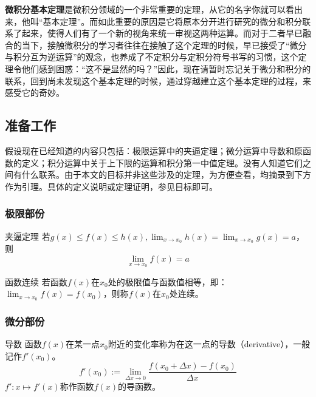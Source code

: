 
\begin{issues}
\issueTODO
\issueMissDepend
\issueNeedCite
\end{issues}

\textbf{微积分基本定理}是微积分领域的一个非常重要的定理，从它的名字你就可以看出来，他叫“基本定理”。而如此重要的原因是它将原本分开进行研究的微分和积分联系了起来，使得人们有了一个新的视角来统一审视这两种运算。而对于二者早已融合的当下，接触微积分的学习者往往在接触了这个定理的时候，早已接受了“微分与积分互为逆运算”的观念，也养成了不定积分与定积分符号书写的习惯，这个定理令他们感到困惑：“这不是显然的吗？”因此，现在请暂时忘记关于微分和积分的联系，回到尚未发现这个基本定理的时候，通过穿越建立这个基本定理的过程，来感受它的奇妙。

\subsection{准备工作}

假设现在已经知道的内容只包括：极限运算中的夹逼定理；微分运算中导数和原函数的定义；积分运算中关于上下限的运算和积分第一中值定理。没有人知道它们之间有什么联系。由于本文的目标并非这些涉及的定理，为方便查看，均摘录到下方作为引理。具体的定义说明或定理证明，参见目标即可。
\subsubsection{极限部份}
\begin{lemma}{夹逼定理}\label{lem_FTcalc_3}
若$g(x)\leq f(x)\leq h(x),\lim _{x\to x_0}h(x)=\lim _{x\to x_0}g(x)=a$，则
$$\lim _{x\to x_0}f(x)=a$$
\end{lemma}

\begin{definition}{函数连续}\label{def_FTcalc_1}
若函数$f(x)$在$x_0$处的极限值与函数值相等，即：$\lim_{x\to x_0}f(x)=f(x_0)$，则称$f(x)$在$x_0$处连续。
\end{definition}

\subsubsection{微分部份}
\begin{definition}{导数}\label{def_FTcalc_2}
函数$f(x)$在某一点$x_0$附近的变化率称为在这一点的导数（derivative），一般记作$f'(x_0)$。
$$f'(x_0):=\lim_{\Delta x\to0}{\frac{f(x_0+\Delta x)-f(x_0)}{\Delta x}}$$
$f':x\mapsto f'(x)$称作函数$f(x)$的导函数。
\end{definition}

